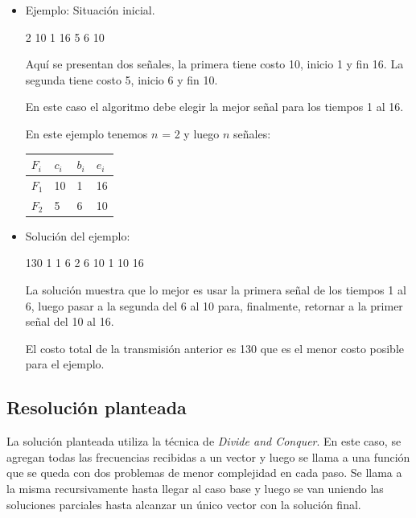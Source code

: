 \begin{itemize}
\item Ejemplo: Situación inicial.

\begin{codesnippet}
2
10 1 16
5 6 10
\end{codesnippet}

Aquí se presentan dos señales, la primera tiene costo 10, inicio 1 y fin 16. La segunda tiene costo 5, inicio 6 y fin 10.

En este caso el algoritmo debe elegir la mejor señal para los tiempos 1 al 16.

En este ejemplo tenemos $n$ = 2 y luego $n$ señales:

\begin{table}[H]
\centering
\parbox{0.3\textwidth}{
    \begin{tabular}{ | l | l | l | l |}
    \hline
$F_{i}$ & $c_{i}$ & $b_{i}$ & $e_{i}$ \\ \hline
$F_{1}$ & 10 & 1 & 16 \\ \hline
$F_{2}$ & 5 & 6 & 10 \\ \hline
    \end{tabular}
}
\end{table}

\item Solución del ejemplo:

\begin{codesnippet}
130
1 1 6
2 6 10
1 10 16
\end{codesnippet}

La solución muestra que lo mejor es usar la primera señal de los tiempos 1 al 6, luego pasar a la segunda del 6 al 10 para, finalmente, retornar a la primer señal del 10 al 16.

El costo total de la transmisión anterior es 130 que es el menor costo posible para el ejemplo.

\end{itemize}

\subsection{Resolución planteada}

La solución planteada utiliza la técnica de \textit{Divide and Conquer}.
En este caso, se agregan todas las frecuencias recibidas a un vector y luego se llama a una función que se queda con dos problemas de menor complejidad en cada paso. Se llama a la misma recursivamente hasta llegar al caso base y luego se van uniendo las soluciones parciales hasta alcanzar un único vector con la solución final. \\


